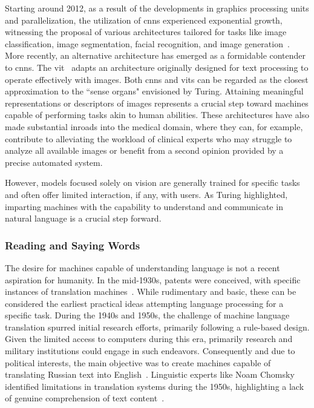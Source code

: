 Starting around 2012, as a result of the developments in graphics processing units and parallelization, the utilization of \glspl{cnn} experienced exponential growth, witnessing the proposal of various architectures tailored for tasks like image classification, image segmentation, facial recognition, and image generation~\cite{bhandare2016applications}. More recently, an alternative architecture has emerged as a formidable contender to \glspl{cnn}. The \gls{vit}~\cite{dosovitskiy2020image} adapts an architecture originally designed for text processing to operate effectively with images. Both \glspl{cnn} and \glspl{vit} can be regarded as the closest approximation to the ``sense organs" envisioned by Turing. Attaining meaningful representations or descriptors of images represents a crucial step toward machines capable of performing tasks akin to human abilities. These architectures have also made substantial inroads into the medical domain, where they can, for example, contribute to alleviating the workload of clinical experts who may struggle to analyze all available images or benefit from a second opinion provided by a precise automated system.

However, models focused solely on vision are generally trained for specific tasks and often offer limited interaction, if any, with users. As Turing highlighted, imparting machines with the capability to understand and communicate in natural language is a crucial step forward.

\subsubsection{Reading and Saying Words}

The desire for machines capable of understanding language is not a recent aspiration for humanity. In the mid-1930s, patents were conceived, with specific instances of translation machines~\cite{johri2021natural}. While rudimentary and basic, these can be considered the earliest practical ideas attempting language processing for a specific task. During the 1940s and 1950s, the challenge of machine language translation spurred initial research efforts, primarily following a rule-based design. Given the limited access to computers during this era, primarily research and military institutions could engage in such endeavors. Consequently and due to political interests, the main objective was to create machines capable of translating Russian text into English~\cite{hutchins1999retrospect}. Linguistic experts like Noam Chomsky identified limitations in translation systems during the 1950s, highlighting a lack of genuine comprehension of text content~\cite{chomsky1896chomsky}.%

